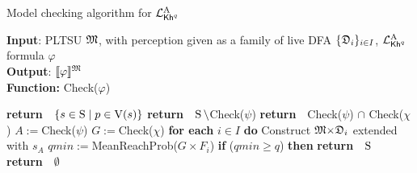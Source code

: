 \renewcommand{\Check}[1]{Check(#1)}%
\newcommand{\MinReachProb}[1]{MeanReachProb(#1)}%
\newcommand{\Return}{\!\textbf{return}\ \ }
\begin{algorithm}[tb]
  \caption{Model checking algorithm for $\PKhadapt$}
  \label{alg:mc:pkhadapt}
  \footnotesize
  \textbf{Input}: PLTSU $\model$, with perception given as a family of live DFA $\{\dfa_i\}_{i\in I}$, $\PKhadapt$ formula $\varphi$\\
  \textbf{Output}: $\truthset{\model}{\varphi}$ \\
  \textbf{Function:} \Check{$\varphi$} 
  \begin{algorithmic}[1] %
    \SWITCH {$\varphi$}
      {\Return {$\{{s\in\S}\mid {p\in\V(s)}\}$}}
    \CASELINE{${\neg\psi}$}
      {\Return{$\S\setminus{}$\Check{$\psi$}}}
    \CASELINE{${\psi\wedge\chi}$}
      {\Return{\Check{$\psi$} $\cap$ \Check{$\chi$}}}
          \STATE \quad\quad $A:={}$\Check{$\psi$}
          \STATE \quad\quad $G:={}$\Check{$\chi$}
          \STATE \quad\quad \textbf{for each} {$i\in I$} \textbf{do} 
              \STATE \quad\quad\quad  Construct $\model{\times}\dfa_i$ extended with $s_A$\;
              \STATE \quad\quad\quad $\mathit{qmin}:={}$\MinReachProb{$G{\times}F_i$}\;
              \STATE \quad\quad\quad \textbf{if} {($\mathit{qmin}\geq q$)} \textbf{then}  {\Return{$\S$}}\label{alg:ln:rettrue}
              \STATE \quad\quad \Return{$\emptyset$}\label{alg:ln:retfalse}
  \end{algorithmic}
  \end{algorithm}





